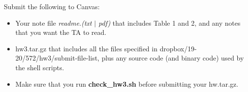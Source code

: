 \documentclass[11pt]{article}
\begin{document}
\vspace{0.5 in}
 Submit the following to Canvas:

\begin{itemize}
  \item Your note file {\it readme.(txt $\mid$ pdf)}
      that includes Table 1 and 2, 
      and any notes that you want the TA to read.
      

  \item  hw3.tar.gz that includes all the files specified in
      dropbox/19-20/572/hw3/submit-file-list, plus any source code
      (and binary code) used by the shell scripts.

  \item Make sure that you run {\bf check\_hw3.sh} before
       submitting your hw.tar.gz.
        
    
\end{itemize}
\end{document}
